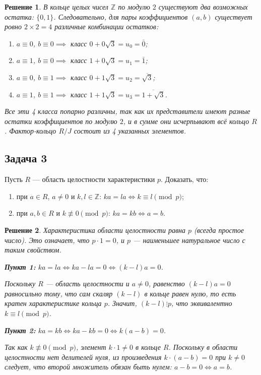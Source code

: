 \documentclass[14pt]{article}
\newtheorem*{solution}{Решение}
\begin{document}
	\begin{solution}
		В кольце целых чисел $\mathbb{Z}$ по модулю $2$ существуют два возможных остатка: $\{0, 1\}$. Следовательно, для пары коэффициентов $(a, b)$ существует ровно $2 \times 2 = 4$ различные комбинации остатков:
		\begin{enumerate}
			\item $a \equiv 0$, $b \equiv 0 \implies$ класс $0 + 0\sqrt{3} = u_0 = \bar{0}$;
			\item $a \equiv 1$, $b \equiv 0 \implies$ класс $1 + 0\sqrt{3} = u_1 = \bar{1}$;
			\item $a \equiv 0$, $b \equiv 1 \implies$ класс $0 + 1\sqrt{3} = u_2 = \overline{\sqrt{3}}$;
			\item $a \equiv 1$, $b \equiv 1 \implies$ класс $1 + 1\sqrt{3} = u_3 = \overline{1+\sqrt{3}}$.
		\end{enumerate}
		Все эти 4 класса попарно различны, так как их представители имеют разные остатки коэффициентов по модулю $2$, и в сумме они исчерпывают всё кольцо $R$. Фактор-кольцо $R/J$ состоит из 4 указанных элементов.
	\end{solution}
	
	\subsection*{Задача 3}
	Пусть $R$ — область целостности характеристики $p$. Доказать, что:
	\begin{enumerate}
		\item при $a \in R$, $a \neq 0$ и $k, l \in \mathbb{Z}$: $ka = la \iff k \equiv l \pmod{p}$;
		\item при $a, b \in R$ и $k \not\equiv 0 \pmod{p}$: $ka = kb \iff a = b$.
	\end{enumerate}
	
	\begin{solution}
		Характеристика области целостности равна $p$ (всегда простое число). Это означает, что $p \cdot 1 = 0$, и $p$ — наименьшее натуральное число с таким свойством.
		
		\textbf{Пункт 1:} $ka = la \iff ka - la = 0 \iff (k - l)a = 0$.
		
		Поскольку $R$ — область целостности и $a \neq 0$, равенство $(k - l)a = 0$ равносильно тому, что сам скаляр $(k - l)$ в кольце равен нулю, то есть кратен характеристике кольца $p$. Значит, $(k - l) \vdots p$, что эквивалентно $k \equiv l \pmod{p}$.
		
		\textbf{Пункт 2:} $ka = kb \iff ka - kb = 0 \iff k(a - b) = 0$.
		
		Так как $k \not\equiv 0 \pmod{p}$, элемент $k \cdot 1 \neq 0$ в кольце $R$. Поскольку в области целостности нет делителей нуля, из произведения $k \cdot (a - b) = 0$ при $k \neq 0$ следует, что второй множитель обязан быть нулем: $a - b = 0 \iff a = b$.
	\end{solution}
	
\end{document}
